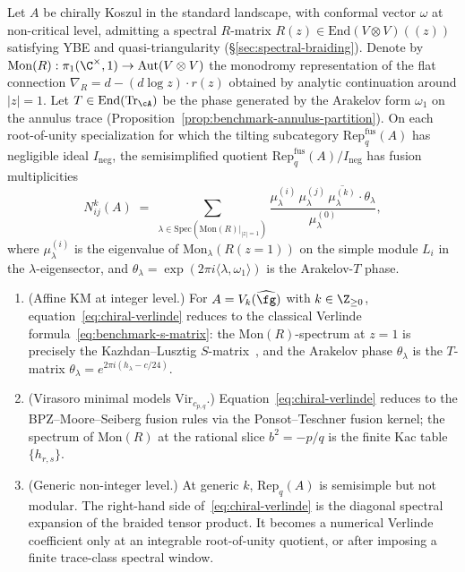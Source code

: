 \begin{theorem}
\label{thm:chiral-verlinde-spectral}
Let $A$ be chirally Koszul in the standard landscape, with
conformal vector $\omega$ at non-critical level, admitting a
spectral $R$-matrix $R(z) \in \mathrm{End}(V \otimes V)((z))$
satisfying YBE and quasi-triangularity
(\S\ref*{sec:spectral-braiding}). Denote by
$\mathrm{Mon}(R) : \pi_1(\C^\times, 1) \to
\mathrm{Aut}(V \otimes V)$ the monodromy representation of the
flat connection
$\nabla_R = d - (d\log z) \cdot r(z)$ obtained by analytic
continuation around $|z|=1$. Let $T \in
\mathrm{End}(\mathrm{Tr}_\cA)$ be the phase generated by the
Arakelov form $\omega_1$ on the annulus trace
(Proposition~\textup{\ref{prop:benchmark-annulus-partition}}). On
each root-of-unity specialization for which the tilting
subcategory $\mathrm{Rep}_q^{\mathrm{fus}}(A)$ has negligible
ideal $I_{\mathrm{neg}}$, the semisimplified quotient
$\mathrm{Rep}_q^{\mathrm{fus}}(A)/I_{\mathrm{neg}}$ has fusion
multiplicities
\begin{equation}\label{eq:chiral-verlinde}
 N^k_{ij}(A)
 \;=\;
 \sum_{\lambda \in \mathrm{Spec}(\mathrm{Mon}(R)|_{|z|=1})}
 \frac{\mu^{(i)}_\lambda \, \mu^{(j)}_\lambda \,
 \overline{\mu^{(k)}_\lambda} \cdot \theta_\lambda}
 {\mu^{(0)}_\lambda},
\end{equation}
where $\mu^{(i)}_\lambda$ is the eigenvalue of
$\mathrm{Mon}_\lambda(R(z=1))$ on the simple module $L_i$ in the
$\lambda$-eigensector, and $\theta_\lambda = \exp(2\pi i \langle
\lambda, \omega_1\rangle)$ is the Arakelov-$T$ phase.

\begin{enumerate}[label=\textup{(\roman*)},nosep]
\item \textup{(Affine KM at integer level.)}
 For $A = V_k(\widehat{\fg})$ with $k \in \Z_{\ge 0}$,
 equation~\eqref{eq:chiral-verlinde} reduces to the classical
 Verlinde formula~\eqref{eq:benchmark-s-matrix}: the
 $\mathrm{Mon}(R)$-spectrum at $z=1$ is precisely the
 Kazhdan--Lusztig $S$-matrix~\cite{KL93,BK01}, and the
 Arakelov phase $\theta_\lambda$ is the $T$-matrix
 $\theta_\lambda = e^{2\pi i (h_\lambda - c/24)}$.
\item \textup{(Virasoro minimal models $\mathrm{Vir}_{c_{p,q}}$.)}
 Equation~\eqref{eq:chiral-verlinde} reduces to the
 BPZ--Moore--Seiberg fusion rules via the Ponsot--Teschner
 fusion kernel; the spectrum of $\mathrm{Mon}(R)$ at the
 rational slice $b^2 = -p/q$ is the finite Kac table
 $\{h_{r,s}\}$.
\item \textup{(Generic non-integer level.)}
 At generic $k$, $\mathrm{Rep}_q(A)$ is semisimple but not
 modular. The right-hand side of~\eqref{eq:chiral-verlinde}
 is the diagonal spectral expansion of the braided tensor
 product. It becomes a numerical Verlinde coefficient only at
 an integrable root-of-unity quotient, or after imposing a
 finite trace-class spectral window.
\end{enumerate}
\end{theorem}

